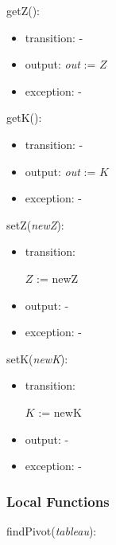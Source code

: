 \documentclass[12pt, titlepage]{article}
\begin{document}
\noindent 
getZ():
\begin{itemize}
	\item transition: -
	\item output: \textit{out} := $Z$
	\item exception: -
\end{itemize}

\noindent 
getK():
\begin{itemize}
	\item transition: -
	\item output: \textit{out} := $K$
	\item exception: -
\end{itemize}

\noindent 
setZ(\textit{newZ}):
\begin{itemize}
	\item transition: 
	
	$Z$ := newZ
	\item output: -
	\item exception: -
\end{itemize}

\noindent 
setK(\textit{newK}):
\begin{itemize}
	\item transition: 
	
	$K$ := newK
	\item output: -
	\item exception: -
\end{itemize}

\subsubsection{Local Functions}

\noindent 
findPivot(\textit{tableau}):
\end{document}
